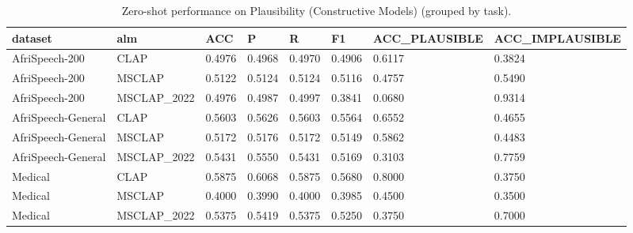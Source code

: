 \begin{table}
\caption{Zero-shot performance on Plausibility (Constructive Models) (grouped by task).}
\label{tab:plausibility_constructive_models_results}
\begin{tabular}{llllllll}
\toprule
dataset & alm & ACC & P & R & F1 & ACC\_PLAUSIBLE & ACC\_IMPLAUSIBLE \\
\midrule
AfriSpeech-200 & CLAP & 0.4976 & 0.4968 & 0.4970 & 0.4906 & 0.6117 & 0.3824 \\
AfriSpeech-200 & MSCLAP & 0.5122 & 0.5124 & 0.5124 & 0.5116 & 0.4757 & 0.5490 \\
AfriSpeech-200 & MSCLAP\_2022 & 0.4976 & 0.4987 & 0.4997 & 0.3841 & 0.0680 & 0.9314 \\
AfriSpeech-General & CLAP & 0.5603 & 0.5626 & 0.5603 & 0.5564 & 0.6552 & 0.4655 \\
AfriSpeech-General & MSCLAP & 0.5172 & 0.5176 & 0.5172 & 0.5149 & 0.5862 & 0.4483 \\
AfriSpeech-General & MSCLAP\_2022 & 0.5431 & 0.5550 & 0.5431 & 0.5169 & 0.3103 & 0.7759 \\
Medical & CLAP & 0.5875 & 0.6068 & 0.5875 & 0.5680 & 0.8000 & 0.3750 \\
Medical & MSCLAP & 0.4000 & 0.3990 & 0.4000 & 0.3985 & 0.4500 & 0.3500 \\
Medical & MSCLAP\_2022 & 0.5375 & 0.5419 & 0.5375 & 0.5250 & 0.3750 & 0.7000 \\
\bottomrule
\end{tabular}
\end{table}
